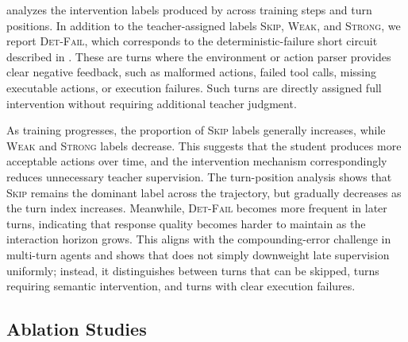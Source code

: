  analyzes the intervention labels produced by \ours{} across training steps and turn positions.
%
In addition to the teacher-assigned labels \textsc{Skip}, \textsc{Weak}, and \textsc{Strong}, we report \textsc{Det-Fail}, which corresponds to the deterministic-failure short circuit described in .
%
These are turns where the environment or action parser provides clear negative feedback, such as malformed actions, failed tool calls, missing executable actions, or execution failures.
%
Such turns are directly assigned full intervention without requiring additional teacher judgment.

As training progresses, the proportion of \textsc{Skip} labels generally increases, while \textsc{Weak} and \textsc{Strong} labels decrease.
%
This suggests that the student produces more acceptable actions over time, and the intervention mechanism correspondingly reduces unnecessary teacher supervision.
%
The turn-position analysis shows that \textsc{Skip} remains the dominant label across the trajectory, but gradually decreases as the turn index increases.
%
Meanwhile, \textsc{Det-Fail} becomes more frequent in later turns, indicating that response quality becomes harder to maintain as the interaction horizon grows.
%
This aligns with the compounding-error challenge in multi-turn agents and shows that \ours{} does not simply downweight late supervision uniformly; instead, it distinguishes between turns that can be skipped, turns requiring semantic intervention, and turns with clear execution failures.

\subsection{Ablation Studies}
\label{sec:appendix_ablation}

